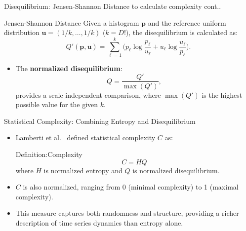 \documentclass{beamer}
\begin{document}
\begin{frame}{Disequilibrium: Jensen-Shannon Distance to calculate complexity cont..}
	\begin{block}{Jensen-Shannon Distance}
		Given a histogram $\mathbf{p}$ and the reference uniform distribution $\mathbf{u} = (1/k, \ldots, 1/k)$ ($k = D!$), the disequilibrium is calculated as:
		\[
		Q'(\mathbf{p},\mathbf{u}) = \sum_{\ell=1}^k \Big( p_\ell \log\frac{p_\ell}{u_\ell} + u_\ell \log\frac{u_\ell}{p_\ell} \Big).
		\]
	\end{block}
	\begin{itemize}
		\item The \textbf{normalized disequilibrium}:
		\[
		Q = \frac{Q'}{\max(Q')},
		\]
		provides a scale-independent comparison, where $\max(Q')$ is the highest possible value for the given $k$.
	\end{itemize}
	
\end{frame}


\begin{frame}{Statistical Complexity: Combining Entropy and Disequilibrium}
	\begin{itemize}
		\item Lamberti et al.~\cite{lamberti2004intensive} defined \alert{statistical complexity} $C$ as:
		\begin{block}{Definition:Complexity}
			\[
			C = H Q
			\]
			where $H$ is normalized entropy and $Q$ is normalized disequilibrium.
		\end{block}
		\item $C$ is also normalized, ranging from 0 (minimal complexity) to 1 (maximal complexity).
		\item This measure captures both randomness and structure, providing a richer description of time series dynamics than entropy alone.
	\end{itemize}
\end{frame}


	
\end{document}
